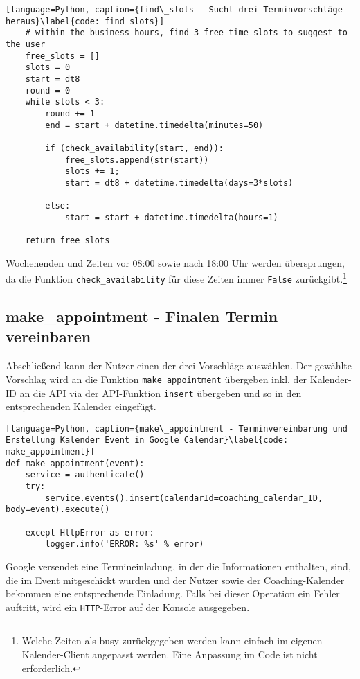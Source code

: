             \begin{lstlisting}[language=Python, caption={find\_slots - Sucht drei Terminvorschläge heraus}\label{code: find_slots}]
    # within the business hours, find 3 free time slots to suggest to the user
    free_slots = []
    slots = 0
    start = dt8
    round = 0
    while slots < 3:
        round += 1
        end = start + datetime.timedelta(minutes=50)
        
        if (check_availability(start, end)): 
            free_slots.append(str(start))
            slots += 1;
            start = dt8 + datetime.timedelta(days=3*slots)

        else: 
            start = start + datetime.timedelta(hours=1)
        
    return free_slots
            \end{lstlisting}
            Wochenenden und Zeiten vor 08:00 sowie nach 18:00 Uhr werden übersprungen, da die Funktion \verb|check_availability| für diese Zeiten immer \verb|False| zurückgibt.\footnote{Welche Zeiten als busy zurückgegeben werden kann einfach im eigenen Kalender-Client angepasst werden. Eine Anpassung im Code ist nicht erforderlich.}


        \subsection{make\_appointment - Finalen Termin vereinbaren}
            Abschließend kann der Nutzer einen der drei Vorschläge auswählen. Der gewählte Vorschlag wird an die Funktion \verb|make_appointment| übergeben inkl. der Kalender-ID an die API via der API-Funktion \verb|insert| übergeben und so in den entsprechenden Kalender eingefügt. 

            \begin{lstlisting}[language=Python, caption={make\_appointment - Terminvereinbarung und Erstellung Kalender Event in Google Calendar}\label{code: make_appointment}]
def make_appointment(event):
    service = authenticate()
    try:
        service.events().insert(calendarId=coaching_calendar_ID, body=event).execute()

    except HttpError as error:
        logger.info('ERROR: %s' % error)
            \end{lstlisting}
            Google versendet eine Termineinladung, in der die Informationen enthalten, sind, die im Event mitgeschickt wurden und der Nutzer sowie der Coaching-Kalender bekommen eine entsprechende Einladung. Falls bei dieser Operation ein Fehler auftritt, wird ein \verb|HTTP|-Error auf der Konsole ausgegeben.

